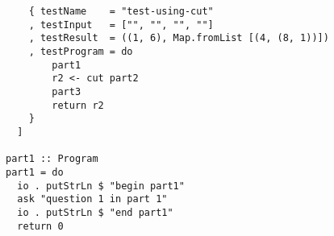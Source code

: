 \documentclass[10pt]{article}
\begin{document}
\begin{lstlisting}
    { testName    = "test-using-cut"                                                                                                                                                          
    , testInput   = ["", "", "", ""]                                                                                                                                                          
    , testResult  = ((1, 6), Map.fromList [(4, (8, 1))])                                                                                                                                      
    , testProgram = do                                                                                                                                                                        
        part1                                                                                                                                                                                 
        r2 <- cut part2                                                                                                                                                                       
        part3                                                                                                                                                                                 
        return r2                                                                                                                                                                             
    }                                                                                                                                                                                         
  ]
  
part1 :: Program                                                                                                                                                                              
part1 = do                                                                                                                                                                                    
  io . putStrLn $ "begin part1"                                                                                                                                                               
  ask "question 1 in part 1"                                                                                                                                                                  
  io . putStrLn $ "end part1"                                                                                                                                                                 
  return 0                                                                                                                                                                                    
                                                                                                                                                                                              

\end{lstlisting}
\end{document}
